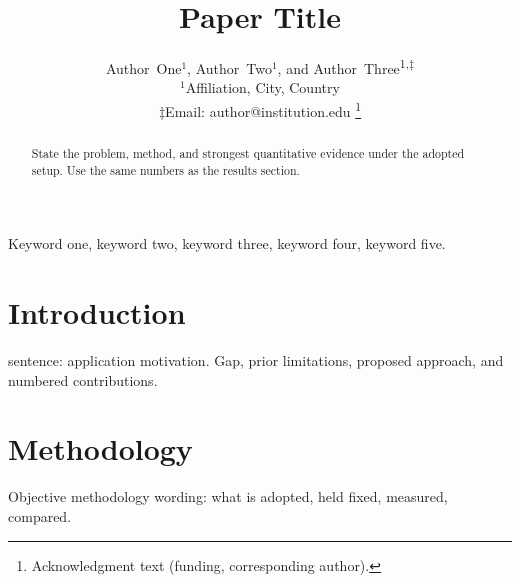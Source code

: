 \documentclass[conference]{IEEEtran}
\begin{document}
\graphicspath{{./figures/}}


\title{Paper Title}

\author{
Author~One$^{1}$,
Author~Two$^{1}$, and
Author~Three\textsuperscript{1,$\ddagger$} \\
$^{1}$Affiliation, City, Country \\
$\ddagger$Email: author@institution.edu
\thanks{Acknowledgment text (funding, corresponding author).}
}

\IEEEoverridecommandlockouts
\maketitle

\begin{abstract}
State the problem, method, and strongest quantitative evidence under the adopted
setup. Use the same numbers as the results section.
\end{abstract}

\begin{IEEEkeywords}
Keyword one, keyword two, keyword three, keyword four, keyword five.
\end{IEEEkeywords}

\section{Introduction}
\label{sec:introduction}

 sentence: application motivation.
Gap, prior limitations, proposed approach, and numbered contributions.

\section{Methodology}
\label{sec:methodology}

Objective methodology wording: what is adopted, held fixed, measured, compared.

\end{document}
